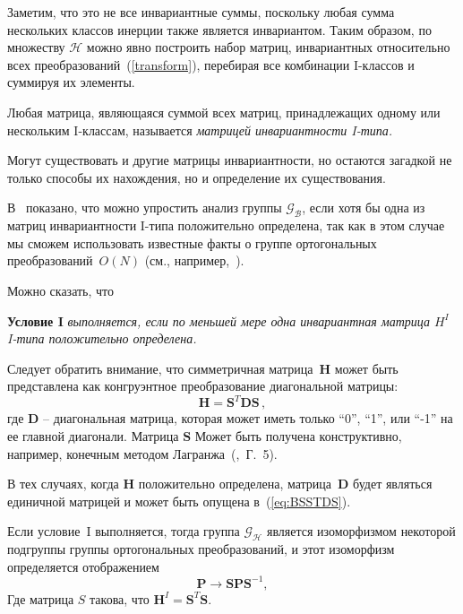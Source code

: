 Заметим, что это не все инвариантные суммы, поскольку любая сумма нескольких классов инерции также является инвариантом. Таким образом, по множеству $ {\mathcal{H}} $ можно явно построить набор матриц, инвариантных относительно всех преобразований~(\ref {transform}), перебирая все комбинации I-классов и суммируя их элементы.

\begin{definition}
Любая матрица, являющаяся суммой всех матриц, принадлежащих одному или нескольким I-классам, называется {\em матрицей инвариантности I-типа.}
\end{definition} 

Могут существовать и другие матрицы инвариантности, но остаются загадкой не только способы их нахождения, но и определение их существования.

В~\cite{yurkov:symmetry} показано, что можно упростить анализ группы $\mathcal{G}_{\mathcal{B}}$, если хотя бы одна из матриц инвариантности I-типа положительно определена, так как в этом случае мы сможем использовать известные факты о группе ортогональных преобразований~$O(N)$ (см., например,~\cite{Zhelobenko}).

Можно сказать, что

\textbf{Условие I} {\em выполняется, если по меньшей мере одна инвариантная матрица $H^I$ I-типа положительно определена.}

Следует обратить внимание, что симметричная матрица~$\textbf{H}$ может быть представлена как конгруэнтное преобразование диагональной матрицы:
%
\begin{equation}
\label{eq:BSSTDS}
\textbf{H}=\textbf{S}^T\textbf{DS} \, ,
\end{equation}
%
где $\textbf{D}$ -- диагональная матрица, которая может иметь только ``0'', ``1'', или ``-1'' на ее главной диагонали. Матрица $\textbf{S}$ Может быть получена конструктивно, например, конечным методом Лагранжа~(\cite{Lancaster},~Г.~5).

В тех случаях, когда $\textbf{H}$ положительно определена, матрица~$\textbf{D}$ будет являться единичной матрицей и может быть опущена в~(\ref{eq:BSSTDS}).

\begin{proposition} \label{prop:orthogonal} Если условие~I выполняется, тогда группа $ {\mathcal{G}}_{\mathcal{H}} $ является изоморфизмом некоторой подгруппы группы ортогональных преобразований, и этот изоморфизм определяется отображением
\begin{equation}
\label{eq:Qdef_map}
\textbf{P} \to \textbf{SPS}^{-1},
\end{equation}
Где матрица $S$ такова, что $\textbf{H}^I=\textbf{S}^T \textbf{S}.$
\end{proposition}

